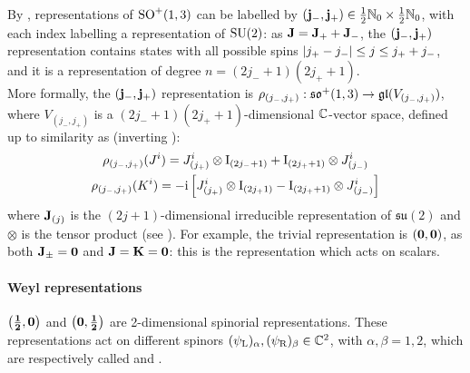 By , representations of $ \mathrm{SO}^+(1,3) $ can be labelled by $ (\mathbf{j}_-,\mathbf{j}_+) \in \frac{1}{2} \mathbb{N}_0 \times \frac{1}{2} \mathbb{N}_0 $, with each index labelling a representation of $ \mathrm{SU}(2) $: as $ \mathbf{J} = \mathbf{J}_+ + \mathbf{J}_- $, the $ (\mathbf{j}_-,\mathbf{j}_+) $ representation contains states with all possible spins $ \left\lvert j_+ - j_-\right\rvert \le j \le j_+ + j_- $, and it is a representation of degree $ n = \left( 2j_- + 1 \right) \left( 2j_+ + 1 \right) $.\\
More formally, the $ (\mathbf{j}_-,\mathbf{j}_+) $ representation is $ \rho_{(j_-,j_+)} : \mathfrak{so}^+(1,3) \rightarrow \mathfrak{gl}(V_{(j_-,j_+)}) $, where $ V_{(j_-,j_+)} $ is a $ (2j_- + 1)(2j_+ + 1) $-dimensional $ \mathbb{C} $-vector space, defined up to similarity as (inverting ):
\begin{equation}
  \begin{gathered}
    \rho_{(j_-,j_+)}(J^i) = J^i_{(j_+)} \otimes \mathrm{I}_{(2j_- + 1)} + \mathrm{I}_{(2j_+ + 1)} \otimes J^i_{(j_-)} \\
    \rho_{(j_-,j_+)}(K^i) = -\mathrm{i} \left[ J^i_{(j_+)} \otimes \mathrm{I}_{(2j_ + 1)} - \mathrm{I}_{(2j_+ + 1)} \otimes J^i_{(j_-)} \right]
  \end{gathered}
  \label{eq:lorentz-su2-repr}
\end{equation}
where $ \mathbf{J}_{(j)} $ is the $ (2j + 1) $-dimensional irreducible representation of $ \mathfrak{su}(2) $ and $ \otimes $ is the tensor product (see ).
For example, the trivial representation is $ \mathbf{\left( 0,0 \right)} $, as both $ \mathbf{J}_{\pm} = \mathbf{0} $ and $ \mathbf{J} = \mathbf{K} = \mathbf{0} $: this is the representation which acts on scalars.

\paragraph{Weyl representations}

$ \mathbf{\left( \frac{1}{2},0 \right)} $ and $ \mathbf{\left( 0,\frac{1}{2} \right)} $ are 2-dimensional spinorial representations. These representations act on different spinors $ (\psi_\text{L})_\alpha , (\psi_\text{R})_\beta \in \mathbb{C}^2 $, with $ \alpha,\beta = 1,2 $, which are respectively called  and .

